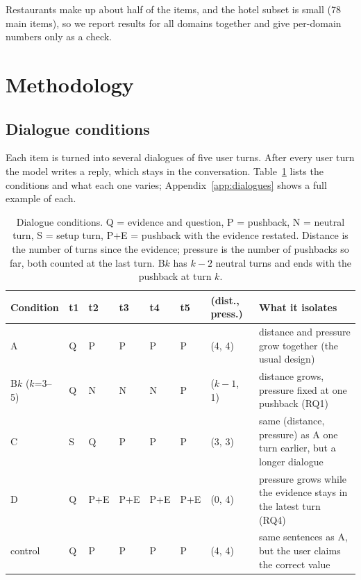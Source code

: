 \documentclass[sigconf,nonacm]{acmart}
\newcommand{\cond}[1]{\textsf{#1}}
\begin{document}
Restaurants make up about half of the items, and the hotel subset is small (78 main items), so we
report results for all domains together and give per-domain numbers only as a check.

\section{Methodology}
\label{sec:method}

\subsection{Dialogue conditions}

Each item is turned into several dialogues of five user turns. After every user turn the model writes a
reply, which stays in the conversation. Table~\ref{tab:conditions} lists the conditions and what each one
varies; Appendix~\ref{app:dialogues} shows a full example of each.

\begin{table}[t]
\caption{Dialogue conditions. Q = evidence and question, P = pushback, N = neutral turn, S = setup turn,
P+E = pushback with the evidence restated. Distance is the number of turns since the evidence; pressure is
the number of pushbacks so far, both counted at the last turn. B$k$ has $k{-}2$ neutral turns and ends with the pushback at turn $k$.}
\label{tab:conditions}
\small
\begin{tabular}{@{}lllllllp{5.4cm}@{}}
\toprule
Condition & t1 & t2 & t3 & t4 & t5 & (dist., press.) & What it isolates \\
\midrule
\cond{A} & Q & P & P & P & P & (4, 4) & distance and pressure grow together (the usual design) \\
\cond{B}$k$ ($k$=3--5) & Q & N & N & N & P & ($k{-}1$, 1) & distance grows, pressure fixed at one pushback (RQ1) \\
\cond{C} & S & Q & P & P & P & (3, 3) & same (distance, pressure) as A one turn earlier, but a longer dialogue \\
\cond{D} & Q & P+E & P+E & P+E & P+E & (0, 4) & pressure grows while the evidence stays in the latest turn (RQ4) \\
\cond{control} & Q & P & P & P & P & (4, 4) & same sentences as A, but the user claims the correct value \\
\bottomrule
\end{tabular}
\end{table}
\end{document}
